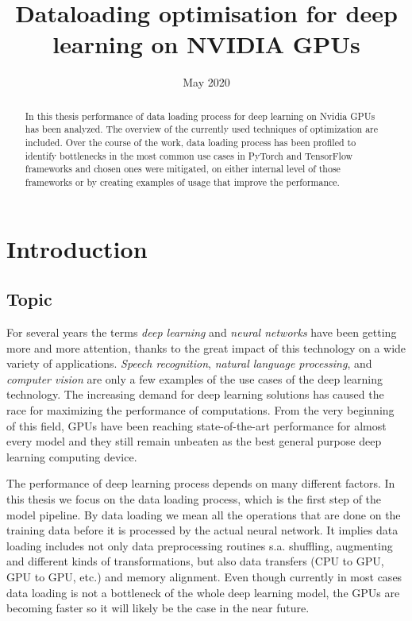 \documentclass[licencjacka,en]{pracamgr}
\title{Dataloading optimisation for deep learning on NVIDIA GPUs}
\date{May 2020}
\begin{document}
\maketitle

\begin{abstract}

In this thesis performance of data loading process for deep learning on Nvidia GPUs has been analyzed. The overview of the currently used techniques of optimization are included. Over the course of the work, data loading process has been profiled to identify bottlenecks in the most common use cases in PyTorch and TensorFlow frameworks and chosen ones were mitigated, on either internal level of those frameworks or by creating examples of usage that improve the performance.

\end{abstract}

\tableofcontents

\chapter*{Introduction}

\section*{Topic}

For several years the terms \emph{deep learning} and \emph{neural networks} have been getting more and more attention, thanks to the great impact of this technology on a wide variety of applications. \emph{Speech recognition}, \emph{natural language processing}, and \emph{computer vision} are only a few examples of the use cases of the deep learning technology. The increasing demand for deep learning solutions has caused the race for maximizing the performance of computations. From the very beginning of this field, GPUs have been reaching state-of-the-art performance for almost every model and they still remain unbeaten as the best general purpose deep learning computing device.

The performance of deep learning process depends on many different factors. In this thesis we focus on the data loading process, which is the first step of the model pipeline. By data loading we mean all the operations that are done on the training data before it is processed by the actual neural network. It implies data loading includes not only data preprocessing routines s.a. shuffling, augmenting and different kinds of transformations, but also data transfers (CPU to GPU, GPU to GPU, etc.) and memory alignment. Even though currently in most cases data loading is not a bottleneck of the whole deep learning model, the GPUs are becoming faster so it will likely be the case in the near future.
\end{document}

